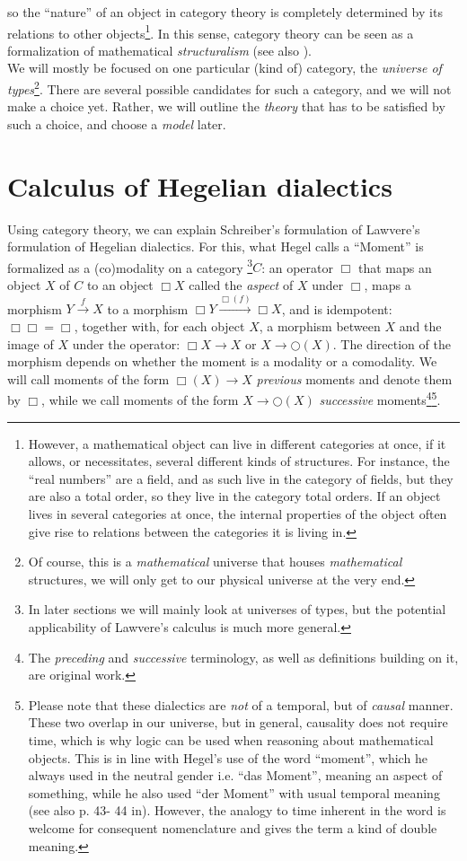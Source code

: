 \documentclass{article}
\begin{document}
so the ``nature'' of an object in category theory is completely determined by its relations to other objects\footnote{However, a mathematical object can live in different categories at once, if it allows, or necessitates, several different kinds of structures. For instance, the ``real numbers'' are a field, and as such live in the category of fields, but they are also a total order, so they live in the category total orders. If an object lives in several categories at once, the internal properties of the object often give rise to relations between the categories it is living in.}. In this sense, category theory can be seen as a formalization of mathematical \emph{structuralism} (see also \cite{Ad03}). \\

We will mostly be focused on one particular (kind of) category, the \emph{universe of types}\footnote{Of course, this is a \emph{mathematical} universe that houses \emph{mathematical} structures, we will only get to our physical universe at the very end.}. There are several possible candidates for such a category, and we will not make a choice yet. Rather, we will outline the \emph{theory} that has to be satisfied by such a choice, and choose a \emph{model} later.


\section{Calculus of Hegelian dialectics}
Using category theory, we can explain Schreiber's formulation of Lawvere's formulation of Hegelian dialectics. For this, what Hegel calls a ``Moment'' is formalized as a (co)modality on a category \footnote{In later sections we will mainly look at universes of types, but the potential applicability of Lawvere's calculus is much more general.}$C$: an operator $\Box$ that maps an object $X$ of $C$ to an object $\Box X$ called the \emph{aspect} of $X$ under $\Box$, maps a morphism $Y\xrightarrow{f} X$ to a morphism $\Box Y\xrightarrow{\Box(f)}\Box X$, and is idempotent: $\Box\Box =\Box$, together with, for each object $X$, a morphism between $X$ and the image of $X$ under the operator: $\Box X\rightarrow X$ or $X\rightarrow \bigcirc(X)$. The direction of the morphism depends on whether the moment is a modality or a comodality. We will call moments of the form $\Box(X)\rightarrow X$ \emph{previous} moments and denote them by $\Box$, while we call moments of the form $X\rightarrow \bigcirc(X)$ \emph{successive} moments\footnote{The \emph{preceding} and \emph{successive} terminology, as well as definitions building on it, are original work.}\footnote{Please note that these dialectics are \emph{not} of a temporal, but of \emph{causal} manner. These two overlap in our universe, but in general, causality does not require time, which is why logic can be used when reasoning about mathematical objects. This is in line with Hegel's use of the word  ``moment'', which he always used in the neutral gender i.e. ``das Moment'', meaning an aspect of something, while he also used ``der Moment'' with usual temporal meaning (see also p. 43- 44 in\cite{Kli}). However, the analogy to time inherent in the word is welcome for consequent nomenclature and gives the term a kind of double meaning.}.
\end{document}
